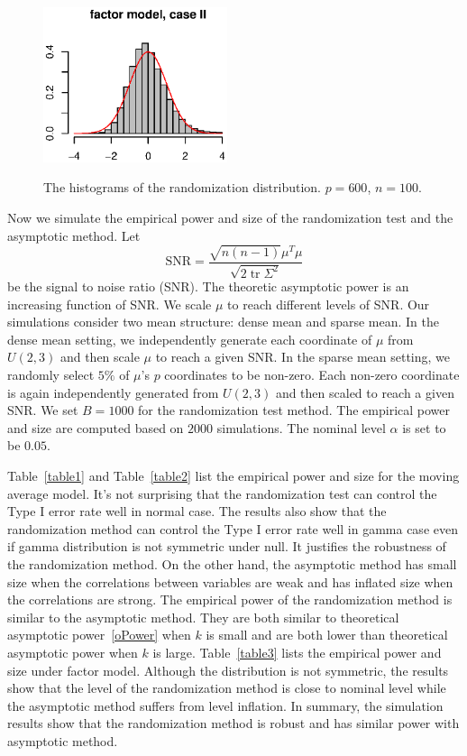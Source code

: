 \documentclass[review]{elsarticle}
\DeclareMathOperator{\mytr}{tr}
\theoremstyle{plain}
\theoremstyle{definition}
\theoremstyle{remark}
\begin{document}
\begin{figure}[htbp]
    \includegraphics[width=0.48\textwidth]{Fig7}\\
    \caption{The histograms of the randomization distribution. $p=600$, $n=100$.}\label{figure:histogram}
\end{figure}




Now we simulate the empirical power and size of the randomization test and the asymptotic method.
Let 
\begin{equation*}
    \mathrm{SNR}=\frac{\sqrt{n(n-1)}\mu^T \mu}{\sqrt{2\mytr \Sigma^2}}
\end{equation*}
be the signal to noise ratio (SNR).
The theoretic asymptotic power is an increasing function of SNR\@.
We scale $\mu$ to reach different levels of SNR\@.
Our simulations consider two mean structure: dense mean and sparse mean.
In the dense mean setting,  we independently generate each coordinate of $\mu$ from $U(2,3)$ and then scale $\mu$ to reach a given SNR\@.
In the sparse mean setting, we randomly select $5\%$ of $\mu$'s $p$ coordinates to be non-zero.
Each non-zero coordinate is again independently generated from $U(2,3)$ and then scaled to reach a given SNR\@.
We set $B=1000$ for the randomization test method.
The empirical power and size are computed based on $2000$ simulations.
The nominal level $\alpha$ is set to be $0.05$.

Table~\ref{table1} and Table~\ref{table2} list the empirical power and size for the moving average model.
It's not surprising that the randomization test can  control the Type I error rate well in normal case.
The results also show that the randomization method can control the Type I error rate well in gamma case even if gamma distribution is not symmetric under null.
It justifies the robustness of the randomization method.
On the other hand, the asymptotic method has small size when the correlations between variables are weak and has inflated size when the correlations are strong.
The empirical power of the randomization method is similar to the asymptotic method.
They are both similar to theoretical asymptotic power~\eqref{oPower} when $k$ is small and are both lower than theoretical asymptotic power when $k$ is large.
Table~\ref{table3} lists the empirical power and size under factor model.
Although the distribution is not symmetric, the results show that the level of the randomization method is close to nominal level while the asymptotic method suffers from level inflation.
In summary, the simulation results show that the randomization method is robust and has similar power with asymptotic method.
\end{document}

